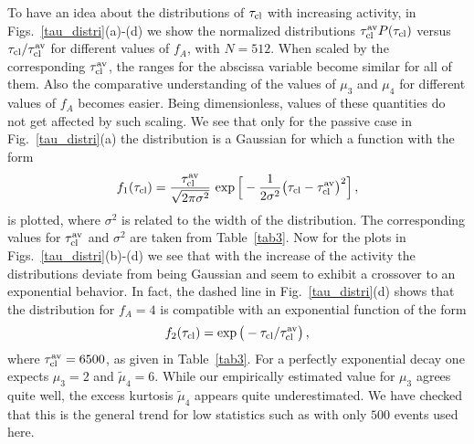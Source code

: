 \documentclass[aps,prx,reprint,showpacs,showkeys,noeprint,longbibliography]{revtex4-1} %
\begin{document}
  
\par 
To have an idea about the distributions of $\tau_{\rm{cl}}$ with increasing activity,  in Figs.~\ref{tau_distri}(a)-(d) we show the normalized distributions $\tau_{\rm{cl}}^{\rm{av}}P(\tau_{\rm{cl}})$ versus $\tau_{\rm{cl}}/\tau_{\rm{cl}}^{\rm{av}}$ for different values of $f_A$, with $N=512$. When scaled  by the corresponding $\tau_{\rm{cl}}^{\rm{av}}$, the ranges for the abscissa variable become similar for all of them. Also the comparative understanding of the values of $\mu_3$ and $\mu_4$ for different values of $f_A$ becomes easier.  Being dimensionless, values of  these quantities do not get affected by such scaling. We see that only for the passive case in Fig.~\ref{tau_distri}(a) the distribution is a Gaussian for which a function with the form
\begin{equation}\label{gauss_fit}
f_1(\tau_{\rm{cl}})=\frac{\tau_{\rm{cl}}^{\rm{av}}}{\sqrt{2\pi\sigma^2}}~ {\exp\Big[-\frac{1}{2\sigma^2}\big({\tau_{\rm{cl}}-\tau_{\rm{cl}}^{\rm{av}}}\big)^2\Big]}\,,
\end{equation}
is plotted, where $\sigma^2$ is related to the width of the distribution. The corresponding values for $\tau_{\rm{cl}}^{\rm{av}}$ and $\sigma^2$ are taken from Table~\ref{tab3}.  Now for the plots in Figs.~\ref{tau_distri}(b)-(d) we see that  with the increase of the  activity the distributions deviate from being Gaussian and seem to exhibit a crossover to an exponential behavior. In fact, the dashed line in Fig.~\ref{tau_distri}(d) shows that the distribution for $f_A=4$ is compatible with an exponential function of the form 
\begin{equation}\label{exp_fit}
f_2(\tau_{\rm{cl}})=\exp\big(-\tau_{\rm{cl}}/\tau_{\rm{cl}}^{\rm{av}}\big)\,,
\end{equation} 
where $\tau_{\rm{cl}}^{\rm{av}}=6500$, as given in Table~\ref{tab3}. For a perfectly exponential decay one expects $\mu_3=2$ and $\tilde{\mu}_4=6$. While our empirically estimated value for $\mu_3$ agrees quite well, the excess kurtosis $\tilde{\mu}_4$ appears quite underestimated. We have checked that this is the general trend for low statistics such as with only $500$ events used here.
\end{document}
